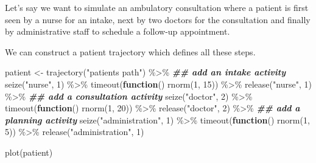 \documentclass[
]{book}
\newenvironment{Shaded}{\begin{snugshade}}{\end{snugshade}}
\newcommand{\ControlFlowTok}[1]{\textcolor[rgb]{0.13,0.29,0.53}{\textbf{#1}}}
\newcommand{\DecValTok}[1]{\textcolor[rgb]{0.00,0.00,0.81}{#1}}
\newcommand{\DocumentationTok}[1]{\textcolor[rgb]{0.56,0.35,0.01}{\textbf{\textit{#1}}}}
\newcommand{\FunctionTok}[1]{\textcolor[rgb]{0.00,0.00,0.00}{#1}}
\newcommand{\NormalTok}[1]{#1}
\newcommand{\OtherTok}[1]{\textcolor[rgb]{0.56,0.35,0.01}{#1}}
\newcommand{\SpecialCharTok}[1]{\textcolor[rgb]{0.00,0.00,0.00}{#1}}
\newcommand{\StringTok}[1]{\textcolor[rgb]{0.31,0.60,0.02}{#1}}
\begin{document}
Let's say we want to simulate an ambulatory consultation where a patient is first seen by a nurse for an intake, next by two doctors for the consultation and finally by administrative staff to schedule a follow-up appointment.

We can construct a patient trajectory which defines all these steps.

\begin{Shaded}
\begin{Highlighting}[]
\NormalTok{patient }\OtherTok{\textless{}{-}} \FunctionTok{trajectory}\NormalTok{(}\StringTok{"patients\textquotesingle{} path"}\NormalTok{) }\SpecialCharTok{\%\textgreater{}\%}
  \DocumentationTok{\#\# add an intake activity }
  \FunctionTok{seize}\NormalTok{(}\StringTok{"nurse"}\NormalTok{, }\DecValTok{1}\NormalTok{) }\SpecialCharTok{\%\textgreater{}\%}
  \FunctionTok{timeout}\NormalTok{(}\ControlFlowTok{function}\NormalTok{() }\FunctionTok{rnorm}\NormalTok{(}\DecValTok{1}\NormalTok{, }\DecValTok{15}\NormalTok{)) }\SpecialCharTok{\%\textgreater{}\%}
  \FunctionTok{release}\NormalTok{(}\StringTok{"nurse"}\NormalTok{, }\DecValTok{1}\NormalTok{) }\SpecialCharTok{\%\textgreater{}\%}
  \DocumentationTok{\#\# add a consultation activity}
  \FunctionTok{seize}\NormalTok{(}\StringTok{"doctor"}\NormalTok{, }\DecValTok{2}\NormalTok{) }\SpecialCharTok{\%\textgreater{}\%}
  \FunctionTok{timeout}\NormalTok{(}\ControlFlowTok{function}\NormalTok{() }\FunctionTok{rnorm}\NormalTok{(}\DecValTok{1}\NormalTok{, }\DecValTok{20}\NormalTok{)) }\SpecialCharTok{\%\textgreater{}\%}
  \FunctionTok{release}\NormalTok{(}\StringTok{"doctor"}\NormalTok{, }\DecValTok{2}\NormalTok{) }\SpecialCharTok{\%\textgreater{}\%}
  \DocumentationTok{\#\# add a planning activity}
  \FunctionTok{seize}\NormalTok{(}\StringTok{"administration"}\NormalTok{, }\DecValTok{1}\NormalTok{) }\SpecialCharTok{\%\textgreater{}\%}
  \FunctionTok{timeout}\NormalTok{(}\ControlFlowTok{function}\NormalTok{() }\FunctionTok{rnorm}\NormalTok{(}\DecValTok{1}\NormalTok{, }\DecValTok{5}\NormalTok{)) }\SpecialCharTok{\%\textgreater{}\%}
  \FunctionTok{release}\NormalTok{(}\StringTok{"administration"}\NormalTok{, }\DecValTok{1}\NormalTok{)}
\end{Highlighting}
\end{Shaded}

\begin{Shaded}
\begin{Highlighting}[]
\FunctionTok{plot}\NormalTok{(patient)}
\end{Highlighting}
\end{Shaded}
\end{document}
